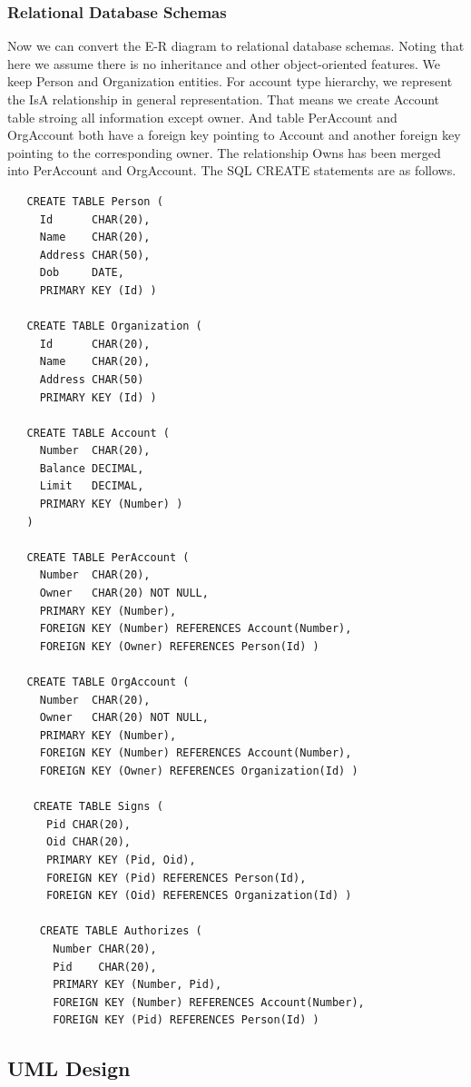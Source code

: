 \documentclass[11pt]{article}
\begin{document}
\subsubsection{Relational Database Schemas}
\par
Now we can convert the E-R diagram to relational database schemas. Noting that here we assume there is no inheritance and other object-oriented features. We keep Person and Organization entities. For account type hierarchy, we represent the IsA relationship in general representation. That means we create Account table stroing all information except owner. And table PerAccount and OrgAccount both have a foreign key pointing to Account and another foreign key pointing to the corresponding owner. The relationship Owns has been merged into PerAccount and OrgAccount. The SQL CREATE statements are as follows.
\begin{verbatim}
   CREATE TABLE Person (
     Id      CHAR(20),
     Name    CHAR(20),
     Address CHAR(50),
     Dob     DATE,
     PRIMARY KEY (Id) )

   CREATE TABLE Organization (
     Id      CHAR(20),
     Name    CHAR(20),
     Address CHAR(50)
     PRIMARY KEY (Id) )

   CREATE TABLE Account (
     Number  CHAR(20),
     Balance DECIMAL,
     Limit   DECIMAL,
     PRIMARY KEY (Number) )
   )

   CREATE TABLE PerAccount (
     Number  CHAR(20),
     Owner   CHAR(20) NOT NULL,
     PRIMARY KEY (Number),
     FOREIGN KEY (Number) REFERENCES Account(Number),
     FOREIGN KEY (Owner) REFERENCES Person(Id) )

   CREATE TABLE OrgAccount (
     Number  CHAR(20),
     Owner   CHAR(20) NOT NULL,
     PRIMARY KEY (Number),
     FOREIGN KEY (Number) REFERENCES Account(Number),
     FOREIGN KEY (Owner) REFERENCES Organization(Id) )

    CREATE TABLE Signs (
      Pid CHAR(20),
      Oid CHAR(20),
      PRIMARY KEY (Pid, Oid),
      FOREIGN KEY (Pid) REFERENCES Person(Id),
      FOREIGN KEY (Oid) REFERENCES Organization(Id) )

     CREATE TABLE Authorizes (
       Number CHAR(20),
       Pid    CHAR(20),
       PRIMARY KEY (Number, Pid),
       FOREIGN KEY (Number) REFERENCES Account(Number),
       FOREIGN KEY (Pid) REFERENCES Person(Id) )
\end{verbatim}

\subsection{UML Design}
\end{document}
